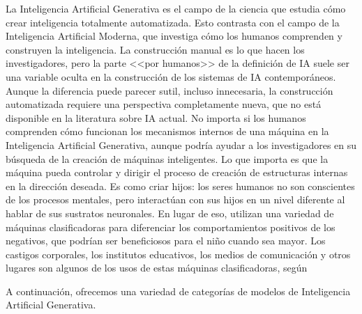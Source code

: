 La Inteligencia Artificial Generativa es el campo de la ciencia que estudia cómo crear inteligencia totalmente automatizada. Esto contrasta con el campo de la Inteligencia Artificial Moderna, que investiga cómo los humanos comprenden y construyen la inteligencia. La construcción manual es lo que hacen los investigadores, pero la parte <<por humanos>> de la definición de IA suele ser una variable oculta en la construcción de los sistemas de IA contemporáneos. Aunque la diferencia puede parecer sutil, incluso innecesaria, la construcción automatizada requiere una perspectiva completamente nueva, que no está disponible en la literatura sobre IA actual. No importa si los humanos comprenden cómo funcionan los mecanismos internos de una máquina en la Inteligencia Artificial Generativa, aunque podría ayudar a los investigadores en su búsqueda de la creación de máquinas inteligentes. Lo que importa es que la máquina pueda controlar y dirigir el proceso de creación de estructuras internas en la dirección deseada. Es como criar hijos: los seres humanos no son conscientes de los procesos mentales, pero interactúan con sus hijos en un nivel diferente al hablar de sus sustratos neuronales. En lugar de eso, utilizan una variedad de máquinas clasificadoras para diferenciar los comportamientos positivos de los negativos, que podrían ser beneficiosos para el niño cuando sea mayor. Los castigos corporales, los institutos educativos, los medios de comunicación y otros lugares son algunos de los usos de estas máquinas clasificadoras, según \parencite{th_zant2010genai}

A continuación, ofrecemos una variedad de categorías de modelos de Inteligencia Artificial Generativa.

